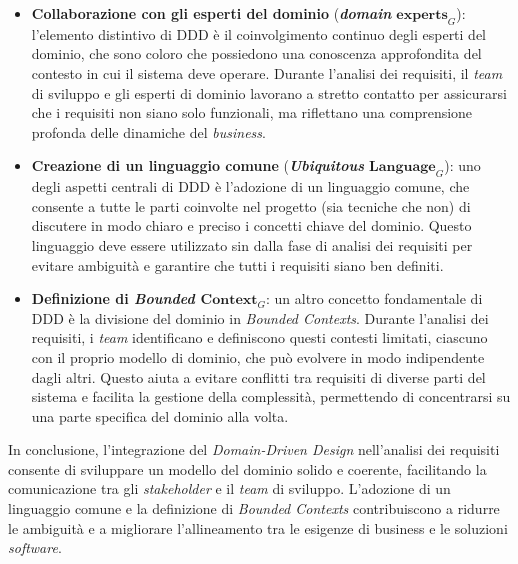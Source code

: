         \begin{itemize}
        \item \textbf{Collaborazione con gli esperti del dominio} (\textit{\textbf{domain} $\textbf{experts}_G$}): l’elemento distintivo di DDD è il coinvolgimento continuo degli esperti del dominio, che sono coloro che possiedono una conoscenza approfondita del contesto in cui il sistema deve operare. Durante l'analisi dei requisiti, il \textit{team} di sviluppo e gli esperti di dominio lavorano a stretto contatto per assicurarsi che i requisiti non siano solo funzionali, ma riflettano una comprensione profonda delle dinamiche del \textit{business}.

        \item \textbf{Creazione di un linguaggio comune} (\textit{\textbf{Ubiquitous} $\textbf{Language}_G$}): uno degli aspetti centrali di DDD è l’adozione di un linguaggio comune, che consente a tutte le parti coinvolte nel progetto (sia tecniche che non) di discutere in modo chiaro e preciso i concetti chiave del dominio. Questo linguaggio deve essere utilizzato sin dalla fase di analisi dei requisiti per evitare ambiguità e garantire che tutti i requisiti siano ben definiti.

        \item \textbf{Definizione di \textit{Bounded $\textbf{Context}_G$}}: un altro concetto fondamentale di DDD è la divisione del dominio in \textit{Bounded Contexts}. Durante l'analisi dei requisiti, i \textit{team} identificano e definiscono questi contesti limitati, ciascuno con il proprio modello di dominio, che può evolvere in modo indipendente dagli altri. Questo aiuta a evitare conflitti tra requisiti di diverse parti del sistema e facilita la gestione della complessità, permettendo di concentrarsi su una parte specifica del dominio alla volta.
        \end{itemize}

        \noindent In conclusione, l’integrazione del \textit{Domain-Driven Design} nell’analisi dei requisiti consente di sviluppare un modello del dominio solido e coerente, facilitando la comunicazione tra gli \textit{stakeholder} e il \textit{team} di sviluppo. L’adozione di un linguaggio comune e la definizione di \textit{Bounded Contexts} contribuiscono a ridurre le ambiguità e a migliorare l’allineamento tra le esigenze di business e le soluzioni \textit{software}.
        
